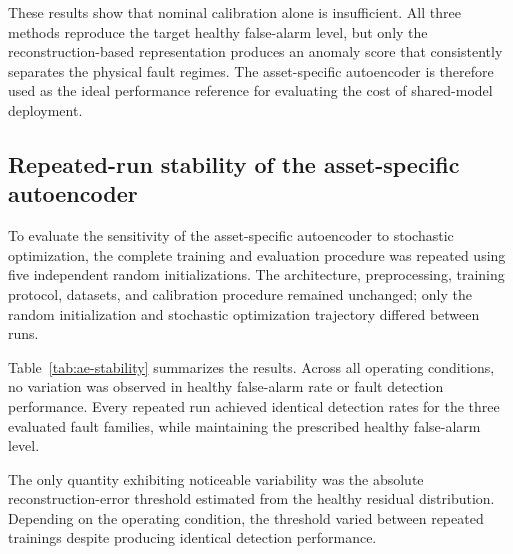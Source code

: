 \documentclass[11pt,a4paper]{article}
\begin{document}
These results show that nominal calibration alone is insufficient. All three methods reproduce
the target healthy false-alarm level, but only the reconstruction-based representation produces
an anomaly score that consistently separates the physical fault regimes. The asset-specific
autoencoder is therefore used as the ideal performance reference for evaluating the cost of
shared-model deployment.

\subsection{Repeated-run stability of the asset-specific autoencoder}
\label{sec:ae-stability}

To evaluate the sensitivity of the asset-specific autoencoder to stochastic
optimization, the complete training and evaluation procedure was repeated
using five independent random initializations. The architecture, preprocessing,
training protocol, datasets, and calibration procedure remained unchanged;
only the random initialization and stochastic optimization trajectory differed
between runs.

Table~\ref{tab:ae-stability} summarizes the results. Across all operating
conditions, no variation was observed in healthy false-alarm rate or fault
detection performance. Every repeated run achieved identical detection rates
for the three evaluated fault families, while maintaining the prescribed
healthy false-alarm level.

The only quantity exhibiting noticeable variability was the absolute
reconstruction-error threshold estimated from the healthy residual
distribution. Depending on the operating condition, the threshold varied
between repeated trainings despite producing identical detection performance.
\end{document}
